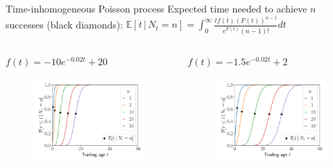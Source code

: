 \documentclass{beamer}
\begin{document}
\begin{frame}[allowframebreaks]{Time-inhomogeneous Poisson process}
Expected time needed to achieve $n$ successes (black diamonds):
$
\mathbb{E}[t \,|\, N_t = n] = \int_0^{\infty} \frac{tf(t)(F(t))^{n-1}}{e^{F(t)}(n - 1)!} dt
$
	\begin{columns}[t]
		\begin{column}{0.49\textwidth}
			\begin{block}{$f(t)=-10e^{-0.02t}+20$}
				\begin{figure}
					\includegraphics[width=\linewidth]{figures/cdft2}
				\end{figure}
			\end{block}  
		\end{column}
		
		\begin{column}{0.49\textwidth}
			\begin{block}{$f(t)=-1.5e^{-0.02t}+2$}
				\begin{figure}
					\includegraphics[width=\linewidth]{figures/cdft1}
				\end{figure}
			\end{block}  
		\end{column}
	\end{columns}



\end{frame}
\end{document}
